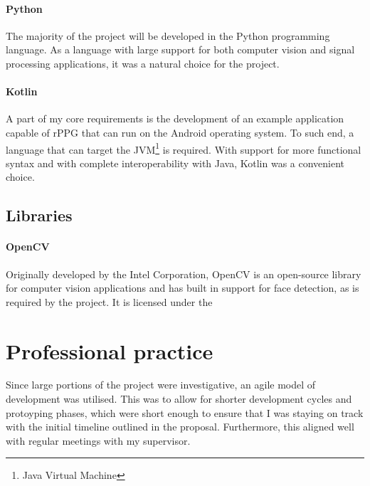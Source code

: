 \paragraph{Python}
The majority of the project will be developed in the Python \cite{Python} programming language. As a language with large support for both computer vision and signal processing applications, it
was a natural choice for the project. 

\paragraph{Kotlin}
A part of my core requirements is the development of an example application capable of rPPG that can run on the Android operating system. 
To such end, a language that can target the JVM\footnote{Java Virtual Machine} is required. 
With support for more functional syntax and with complete interoperability with Java, Kotlin \cite{Kotlin} was a convenient choice.

\subsection{Libraries}
\label{section:libraries}
\paragraph{OpenCV} 
Originally developed by the Intel Corporation, OpenCV \cite{OpenCV} is an open-source library for computer vision applications and has built in support for face detection, as is required by the project. It is licensed under the 


\section{Professional practice}
Since large portions of the project were investigative, an agile model of development was utilised. 
This was to allow for shorter development cycles and protoyping phases, which were short enough to ensure that I was staying on track with the 
initial timeline outlined in the proposal. Furthermore, this aligned well with regular meetings with my supervisor.

